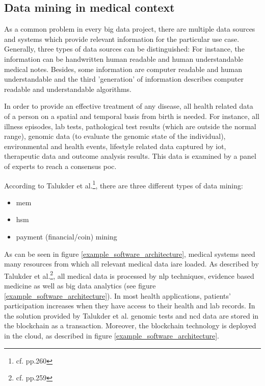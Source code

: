 \subsection{Data mining in medical context}

As a common problem in every big data project, there are multiple data sources and systems which provide relevant information for the particular use case. Generally, three types of data sources can be distinguished: For instance, the information can be handwritten human readable and human understandable medical notes. Besides, some information are computer readable and human understandable and the third 'generation' of information describes computer readable and understandable algorithms.

In order to provide an effective treatment of any disease, all health related data of a person on a spatial and temporal basis from birth is needed. For instance, all illness episodes, lab tests, pathological test results (which are outside the normal range), genomic data (to evaluate the genomic state of the individual), environmental and health events, lifestyle related data captured by \ac{iot}, therapeutic data and outcome analysis results.
This data is examined by a panel of experts to reach a consensus \ac{poc}.

According to Talukder et al.\footnote{cf.\autocite{talukder} pp.260}, there are three different types of data mining: 

\begin{itemize}
\setlength\itemsep{-0.5em}
  \item \ac{mem}
  \item \ac{hsm} 
  \item payment (financial/coin) mining
\end{itemize}

As can be seen in figure \ref{example_software_architecture}, medical systems need many resources from which all relevant medical data iare loaded. As described by Talukder et al.\footnote{cf.\autocite{talukder} pp.259}, all medical data is processed by \ac{nlp} techniques, evidence based medicine as well as big data analytics (see figure \ref{example_software_architecture}).
In most health applications, patients' participation increases when they have access to their health and lab records. In the solution provided by Talukder et al. genomic tests and \ac{ncd} data are stored in the blockchain as a transaction.
Moreover, the blockchain technology is deployed in the cloud, as described in figure \ref{example_software_architecture}.

